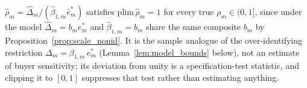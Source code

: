\label{cor:ratio_specification_test}
$\hat\rho_m=\hat\Delta_m/(\hat\beta_{1,m}\hat e^*_m)$ satisfies $\mathrm{plim}\,\hat\rho_m=1$
for every true $\rho_m\in(0,1]$, since under the model $\hat\Delta_m=b_m e^*_m$ and
$\hat\beta_{1,m}=b_m$ share the same composite $b_m$ by
Proposition~\ref{prop:scale_nonid}. It is the sample analogue of the over-identifying
restriction $\Delta_m=\beta_{1,m}\,e^*_m$ (Lemma~\ref{lem:model_bounds} below), not an
estimate of buyer sensitivity; its deviation from unity is a specification-test statistic, and
clipping it to $[0,1]$ suppresses that test rather than estimating anything.
